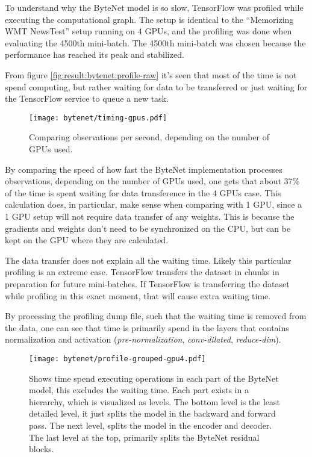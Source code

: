 To understand why the ByteNet model is so slow, TensorFlow was profiled while executing the computational graph. The setup is identical to the ``Memorizing WMT NewsTest'' setup running on 4 GPUs, and the profiling was done when evaluating the 4500th mini-batch. The 4500th mini-batch was chosen because the performance has reached its peak and stabilized.

From figure \ref{fig:result:bytenet:profile-raw} it's seen that most of the time is not spend computing, but rather waiting for data to be transferred or just waiting for the TensorFlow service to queue a new task.

\begin{figure}[h]
    \centering
    \texttt{[image: bytenet/timing-gpus.pdf]}
    \caption{Comparing observations per second, depending on the number of GPUs used.}
    \label{fig:result:bytenet:timing-gpus}
\end{figure}

By comparing the speed of how fast the ByteNet implementation processes observations, depending on the number of GPUs used, one gets that about 37\% of the time is spent waiting for data transference in the 4 GPUs case. This calculation does, in particular, make sense when comparing with 1 GPU, since a 1 GPU setup will not require data transfer of any weights. This is because the gradients and weights don't need to be synchronized on the CPU, but can be kept on the GPU where they are calculated.

The data transfer does not explain all the waiting time. Likely this particular profiling is an extreme case. TensorFlow transfers the dataset in chunks in preparation for future mini-batches. If TensorFlow is transferring the dataset while profiling in this exact moment, that will cause extra waiting time.

By processing the profiling dump file, such that the waiting time is removed from the data, one can see that time is primarily spend in the layers that contains normalization and activation (\textit{pre-normalization}, \textit{conv-dilated}, \textit{reduce-dim}).

\begin{figure}[h]
    \centering
    \texttt{[image: bytenet/profile-grouped-gpu4.pdf]}
    \caption{Shows time spend executing operations in each part of the ByteNet model, this excludes the waiting time. Each part exists in a hierarchy, which is visualized as levels. The bottom level is the least detailed level, it just splits the model in the backward and forward pass. The next level, splits the model in the encoder and decoder. The last level at the top, primarily splits the ByteNet residual blocks.}
    \label{fig:result:bytenet:profile-grouped}
\end{figure}


